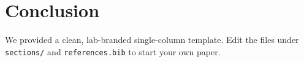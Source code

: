\section{Conclusion}
We provided a clean, lab-branded single-column template. Edit the files under
\texttt{sections/} and \texttt{references.bib} to start your own paper.
